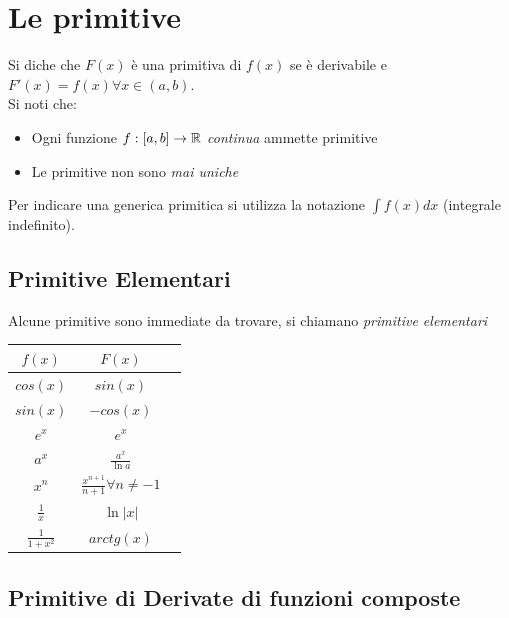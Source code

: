 \documentclass[12pt, a4paper, openany]{book}
\begin{document}
\section{Le primitive}
Si diche che $F(x)$ è una primitiva di $f(x)$ se è derivabile e $F'(x) = f(x) \forall x\in (a,b)$.
\\Si noti che:
\begin{itemize}
	\item Ogni funzione $f:[a,b] \to \mathbb{R}$ \emph{continua} ammette primitive
	\item Le primitive non sono \emph{mai uniche}
\end{itemize}
Per indicare una generica primitica si utilizza la notazione $\int f(x) dx$ (integrale indefinito).

\subsection{Primitive Elementari}
Alcune primitive sono immediate da trovare, si chiamano \emph{primitive elementari}\\
\begin{tabular}{ |c|c|c| }
	\hline
	$f(x)$            & $F(x)$                                  \\
	\hline
	$cos(x)$          & $sin(x)$                                \\
	\hline
	$sin(x)$          & $-cos(x)$                               \\
	\hline
	$e^x$             & $e^x$                                   \\
	\hline
	$a^x$             & $\frac{a^x}{\ln a} $                    \\
	\hline
	$x^n$             & $\frac{x^{n+1}}{n+1} \forall n\neq -1 $ \\
	\hline
	$\frac{1}{x}$     & $\ln |x| $                              \\
	\hline
	$\frac{1}{1+x^2}$ & $arctg(x) $                             \\
	\hline
\end{tabular}

\subsection{Primitive di Derivate di funzioni composte}
\end{document}
